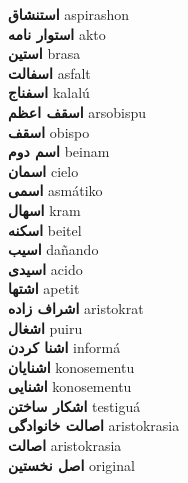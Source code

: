 \textbf{ استنشاق  } aspirashon \\
\textbf{ استوار نامه  } akto \\
\textbf{ استین  } brasa \\
\textbf{ اسفالت  } asfalt \\
\textbf{ اسفناج  } kalalú \\
\textbf{ اسقف اعظم  } arsobispu \\
\textbf{ اسقف  } obispo \\
\textbf{ اسم دوم  } beinam \\
\textbf{ اسمان  } cielo \\
\textbf{ اسمی  } asmátiko \\
\textbf{ اسهال  } kram \\
\textbf{ اسکنه  } beitel \\
\textbf{ اسیب  } dañando \\
\textbf{ اسیدی  } acido \\
\textbf{ اشتها  } apetit \\
\textbf{ اشراف زاده  } aristokrat \\
\textbf{ اشغال  } puiru \\
\textbf{ اشنا کردن  } informá \\
\textbf{ اشنایان  } konosementu \\
\textbf{ اشنایی  } konosementu \\
\textbf{ اشکار ساختن  } testiguá \\
\textbf{ اصالت خانوادگی  } aristokrasia \\
\textbf{ اصالت  } aristokrasia \\
\textbf{ اصل نخستین  } original \\
